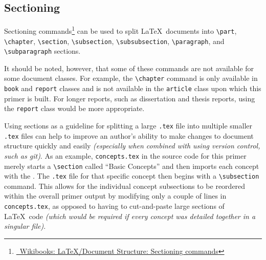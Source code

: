 \subsection{Sectioning}
\label{example:sect:concepts:sectioning}
Sectioning commands\footnote{\href{https://en.wikibooks.org/wiki/LaTeX/Document_Structure\#Sectioning_commands}{\faBook\ Wikibooks: \LaTeX{}/Document Structure: Sectioning commands}} can be used to split \LaTeX\ documents into \texttt{\textbackslash part}, \texttt{\textbackslash chapter}, \texttt{\textbackslash section}, \texttt{\textbackslash subsection}, \texttt{\textbackslash subsubsection}, \texttt{\textbackslash paragraph}, and \texttt{\textbackslash subparagraph} sections.

It should be noted, however, that some of these commands are not available for some document classes. For example, the \texttt{\textbackslash chapter} command is only available in \texttt{book} and \texttt{report} classes and is not available in the \texttt{article} class upon which this primer is built. For longer reports, such as dissertation and thesis reports, using the \texttt{report} class would be more appropriate.

Using sections as a guideline for splitting a large \texttt{.tex} file into multiple smaller \texttt{.tex} files can help to improve an author's ability to make changes to document structure quickly and easily \textit{(especially when combined with using version control, such as git)}. As an example, \texttt{concepts.tex} in the source code for this primer merely starts a \texttt{\textbackslash section} called ``Basic Concepts'' and then imports each concept with the . The \texttt{.tex} file for that specific concept then begins with a \texttt{\textbackslash subsection} command. This allows for the individual concept subsections to be reordered within the overall primer output by modifying only a couple of lines in \texttt{concepts.tex}, as opposed to having to cut-and-paste large sections of \LaTeX\ code \textit{(which would be required if every concept was detailed together in a singular file)}.
